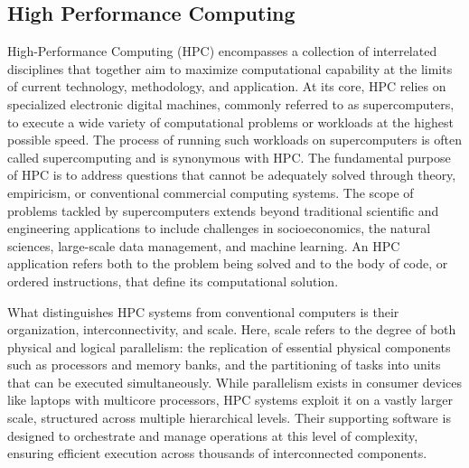 \subsection{High Performance Computing}
\label{sec:background_hpc}
High-Performance Computing (HPC) encompasses a collection of interrelated disciplines that together aim to maximize computational capability at the limits of current technology, methodology, and application. At its core, HPC relies on specialized electronic digital machines, commonly referred to as supercomputers, to execute a wide variety of computational problems or workloads at the highest possible speed. The process of running such workloads on supercomputers is often called supercomputing and is synonymous with HPC. The fundamental purpose of HPC is to address questions that cannot be adequately solved through theory, empiricism, or conventional commercial computing systems. The scope of problems tackled by supercomputers extends beyond traditional scientific and engineering applications to include challenges in socioeconomics, the natural sciences, large-scale data management, and machine learning. An HPC application refers both to the problem being solved and to the body of code, or ordered instructions, that define its computational solution.

What distinguishes HPC systems from conventional computers is their organization, interconnectivity, and scale. Here, scale refers to the degree of both physical and logical parallelism: the replication of essential physical components such as processors and memory banks, and the partitioning of tasks into units that can be executed simultaneously. While parallelism exists in consumer devices like laptops with multicore processors, HPC systems exploit it on a vastly larger scale, structured across multiple hierarchical levels. Their supporting software is designed to orchestrate and manage operations at this level of complexity, ensuring efficient execution across thousands of interconnected components.

